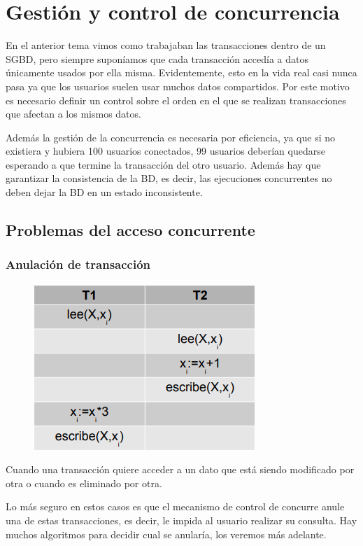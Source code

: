 \chapter{Gestión y control de concurrencia}

En el anterior tema vimos como trabajaban las transacciones dentro de un SGBD, pero siempre suponíamos que cada transacción accedía a datos únicamente usados por ella misma. Evidentemente, esto en la vida real casi nunca pasa ya que los usuarios suelen usar muchos datos compartidos. Por este motivo es necesario definir un control sobre el orden en el que se realizan transacciones que afectan a los mismos datos.

Además la gestión de la concurrencia es necesaria por eficiencia, ya que si no existiera y hubiera 100 usuarios conectados, 99 usuarios deberían quedarse esperando a que termine la transacción del otro usuario. Además hay que garantizar la consistencia de la BD, es decir, las ejecuciones concurrentes no deben dejar la BD en un estado inconsistente.

\section{Problemas del acceso concurrente}

\subsection{Anulación de transacción}

\begin{figure}[H]
  \center
  \includegraphics[scale=0.5]{img/22.png}
\end{figure}

Cuando una transacción quiere acceder a un dato que está siendo modificado por otra o cuando es eliminado por otra.

Lo más seguro en estos casos es que el mecanismo de control de concurre anule una de estas transacciones, es decir, le impida al usuario realizar su consulta. Hay muchos algoritmos para decidir cual se anularía, los veremos más adelante.

